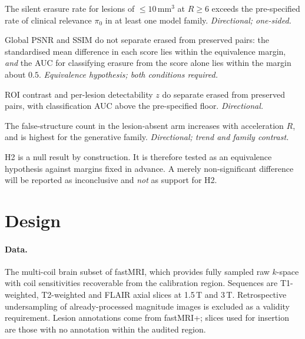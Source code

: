 \documentclass[11pt,a4paper]{article}
\begin{document}
\begin{description}[leftmargin=3.2em,style=nextline]
\item[\textbf{H1}] The silent erasure rate for lesions of
$\le 10\,\mathrm{mm}^3$ at $R \ge 6$ exceeds the pre-specified rate of
clinical relevance $\pi_0$ in at least one model family.
\emph{Directional; one-sided.}

\item[\textbf{H2}] Global PSNR and SSIM do not separate erased from preserved
pairs: the standardised mean difference in each score lies within the
equivalence margin, \emph{and} the AUC for classifying erasure from the score
alone lies within the margin about $0.5$. \emph{Equivalence hypothesis; both
conditions required.}

\item[\textbf{H3}] ROI contrast and per-lesion detectability $z$ do separate
erased from preserved pairs, with classification AUC above the pre-specified
floor. \emph{Directional.}

\item[\textbf{H4}] The false-structure count in the lesion-absent arm
increases with acceleration $R$, and is highest for the generative family.
\emph{Directional; trend and family contrast.}
\end{description}

H2 is a null result by construction. It is therefore tested as an equivalence
hypothesis against margins fixed in advance. A merely non-significant
difference will be reported as inconclusive and \emph{not} as support for H2.

\section{Design}

\paragraph{Data.} The multi-coil brain subset of fastMRI, which provides fully
sampled raw $k$-space with coil sensitivities recoverable from the calibration
region. Sequences are T1-weighted, T2-weighted and FLAIR axial slices at
1.5\,T and 3\,T. Retrospective undersampling of already-processed magnitude
images is excluded as a validity requirement. Lesion annotations come from
fastMRI+; slices used for insertion are those with no annotation within the
audited region.
\end{document}
